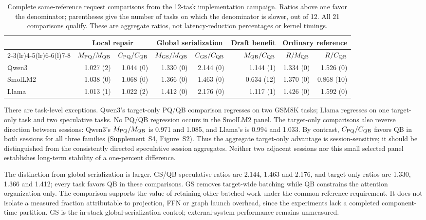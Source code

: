 \begin{table}[t]\centering\small
\caption{Complete same-reference request comparisons from the 12-task implementation campaign. Ratios above one favor the denominator; parentheses give the number of tasks on which the denominator is slower, out of 12. All 21 comparisons qualify. These are aggregate ratios, not latency-reduction percentages or kernel timings.}
\label{tab:cost}
\begin{tabular}{@{}lrrrrrrr@{}}\toprule
 & \multicolumn{2}{c}{Local repair} & \multicolumn{2}{c}{Global serialization} & Draft benefit & \multicolumn{2}{c}{Ordinary reference}\\
\cmidrule(lr){2-3}\cmidrule(lr){4-5}\cmidrule(lr){6-6}\cmidrule(l){7-8}
 & $M_{\mathrm{PQ}}/M_{\mathrm{QB}}$ & $C_{\mathrm{PQ}}/C_{\mathrm{QB}}$ & $M_{\mathrm{GS}}/M_{\mathrm{QB}}$ & $C_{\mathrm{GS}}/C_{\mathrm{QB}}$ & $M_{\mathrm{QB}}/C_{\mathrm{QB}}$ & $R/M_{\mathrm{QB}}$ & $R/C_{\mathrm{QB}}$\\\midrule
Qwen3 &1.027 (2)&1.044 (0)&1.330 (0)&2.144 (0)&1.144 (1)&1.334 (0)&1.526 (0)\\
SmolLM2 &1.038 (0)&1.068 (0)&1.366 (0)&1.463 (0)&0.634 (12)&1.370 (0)&0.868 (10)\\
Llama &1.013 (1)&1.022 (2)&1.412 (0)&2.176 (0)&1.117 (1)&1.426 (0)&1.592 (0)\\\bottomrule
\end{tabular}
\end{table}

There are task-level exceptions. Qwen3's target-only PQ/QB comparison regresses on two GSM8K tasks; Llama regresses on one target-only task and two speculative tasks. No PQ/QB regression occurs in the SmolLM2 panel. The target-only comparisons also reverse direction between sessions: Qwen3's $M_{\mathrm{PQ}}/M_{\mathrm{QB}}$ is 0.971 and 1.085, and Llama's is 0.994 and 1.033. By contrast, $C_{\mathrm{PQ}}/C_{\mathrm{QB}}$ favors QB in both sessions for all three families (Supplement~S4, Figure~S2). Thus the aggregate target-only advantage is session-sensitive; it should be distinguished from the consistently directed speculative session aggregates. Neither two adjacent sessions nor this small selected panel establishes long-term stability of a one-percent difference.

The distinction from global serialization is larger. GS/QB speculative ratios are 2.144, 1.463 and 2.176, and target-only ratios are 1.330, 1.366 and 1.412; every task favors QB in these comparisons. GS removes target-wide batching while QB constrains the attention organization only. The comparison supports the value of retaining other batched work under the common reference requirement. It does not isolate a measured fraction attributable to projection, FFN or graph launch overhead, since the experiments lack a completed component-time partition. GS is the in-stack global-serialization control; external-system performance remains unmeasured.

